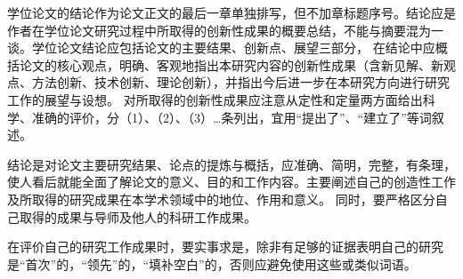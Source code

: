 
\begin{conclusion}
学位论文的结论作为论文正文的最后一章单独排写，但不加章标题序号。结论应是作者在学位论文研究过程中所取得的创新性成果的概要总结，不能与摘要混为一谈。学位论文结论应包括论文的主要结果、创新点、展望三部分，
在结论中应概括论文的核心观点，明确、客观地指出本研究内容的创新性成果（含新见解、新观点、方法创新、技术创新、理论创新），并指出今后进一步在本研究方向进行研究工作的展望与设想。
对所取得的创新性成果应注意从定性和定量两方面给出科学、准确的评价，分（1）、（2）、（3）…条列出，宜用“提出了”、“建立了”等词叙述。

结论是对论文主要研究结果、论点的提炼与概括，应准确、简明，完整，有条理，使人看后就能全面了解论文的意义、目的和工作内容。主要阐述自己的创造性工作及所取得的研究成果在本学术领域中的地位、作用和意义。
同时，要严格区分自己取得的成果与导师及他人的科研工作成果。

在评价自己的研究工作成果时，要实事求是，除非有足够的证据表明自己的研究是“首次”的，“领先”的，“填补空白”的，否则应避免使用这些或类似词语。
    
\end{conclusion}